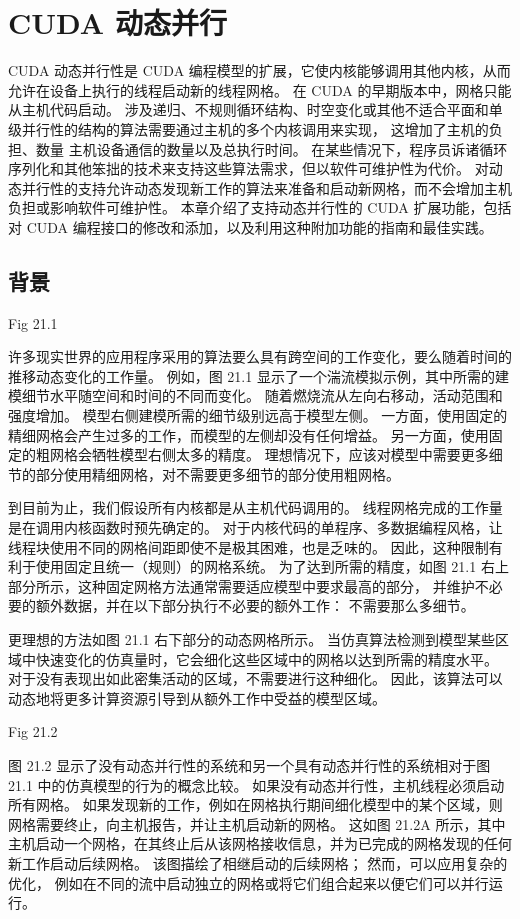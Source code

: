 \section{CUDA 动态并行}
CUDA 动态并行性是 CUDA 编程模型的扩展，它使内核能够调用其他内核，从而允许在设备上执行的线程启动新的线程网格。 
在 CUDA 的早期版本中，网格只能从主机代码启动。 
涉及递归、不规则循环结构、时空变化或其他不适合平面和单级并行性的结构的算法需要通过主机的多个内核调用来实现，
这增加了主机的负担、数量 主机设备通信的数量以及总执行时间。 
在某些情况下，程序员诉诸循环序列化和其他笨拙的技术来支持这些算法需求，但以软件可维护性为代价。 
对动态并行性的支持允许动态发现新工作的算法来准备和启动新网格，而不会增加主机负担或影响软件可维护性。 
本章介绍了支持动态并行性的 CUDA 扩展功能，包括对 CUDA 编程接口的修改和添加，以及利用这种附加功能的指南和最佳实践。

\subsection{背景}
{\color{red} Fig 21.1}

许多现实世界的应用程序采用的算法要么具有跨空间的工作变化，要么随着时间的推移动态变化的工作量。 
例如，图 21.1 显示了一个湍流模拟示例，其中所需的建模细节水平随空间和时间的不同而变化。 
随着燃烧流从左向右移动，活动范围和强度增加。 模型右侧建模所需的细节级别远高于模型左侧。 
一方面，使用固定的精细网格会产生过多的工作，而模型的左侧却没有任何增益。 
另一方面，使用固定的粗网格会牺牲模型右侧太多的精度。 
理想情况下，应该对模型中需要更多细节的部分使用精细网格，对不需要更多细节的部分使用粗网格。

到目前为止，我们假设所有内核都是从主机代码调用的。 线程网格完成的工作量是在调用内核函数时预先确定的。 
对于内核代码的单程序、多数据编程风格，让线程块使用不同的网格间距即使不是极其困难，也是乏味的。 
因此，这种限制有利于使用固定且统一（规则）的网格系统。 
为了达到所需的精度，如图 21.1 右上部分所示，这种固定网格方法通常需要适应模型中要求最高的部分，
并维护不必要的额外数据，并在以下部分执行不必要的额外工作： 不需要那么多细节。

更理想的方法如图 21.1 右下部分的动态网格所示。 
当仿真算法检测到模型某些区域中快速变化的仿真量时，它会细化这些区域中的网格以达到所需的精度水平。 
对于没有表现出如此密集活动的区域，不需要进行这种细化。 
因此，该算法可以动态地将更多计算资源引导到从额外工作中受益的模型区域。

{\color{red} Fig 21.2}

图 21.2 显示了没有动态并行性的系统和另一个具有动态并行性的系统相对于图 21.1 中的仿真模型的行为的概念比较。 
如果没有动态并行性，主机线程必须启动所有网格。 
如果发现新的工作，例如在网格执行期间细化模型中的某个区域，则网格需要终止，向主机报告，并让主机启动新的网格。 
这如图 21.2A 所示，其中主机启动一个网格，在其终止后从该网格接收信息，并为已完成的网格发现的任何新工作启动后续网格。 
该图描绘了相继启动的后续网格； 然而，可以应用复杂的优化，
例如在不同的流中启动独立的网格或将它们组合起来以便它们可以并行运行。


